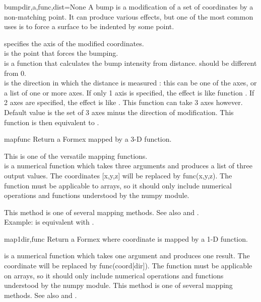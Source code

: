 {{\begin{methoddesc}{bump}{dir,a,func,dist=None}
A bump is a modification of a set of coordinates by a non-matching point. It can produce various effects, but one of the most common uses is to force a surface to be indented by some point.
        
 specifies the axis of the modified coordinates.\\
 is the point that forces the bumping.\\
 is a function that calculates the bump intensity from distance.  should be different from 0.\\
 is the direction in which the distance is measured : this can be one of the axes, or a list of one or more axes. If only 1 axis is specified, the effect is like function . If 2 axes are specified, the effect is like . This function can take 3 axes however. Default value is the set of 3 axes minus the direction of modification. This function is then equivalent to .
\end{methoddesc}

\begin{methoddesc}{map}{func}
Return a Formex mapped by a 3-D function.

This is one of the versatile mapping functions.\\
 is a numerical function which takes three arguments and produces a list of three output values. The coordinates [x,y,z] will be replaced by func(x,y,z). The function must be applicable to arrays, so it should only include numerical operations and functions understood by the numpy module.

This method is one of several mapping methods. See also  and .\\
Example:  is equivalent with .
\end{methoddesc}

\begin{methoddesc}{map1}{dir,func}
Return a Formex where coordinate  is mapped by a 1-D function.

 is a numerical function which takes one argument and produces one result. The coordinate  will be replaced by func(coord[dir]). The function must be applicable on arrays, so it should only include numerical operations and functions understood by the numpy module. This method is one of several mapping methods. See also  and .
\end{methoddesc}

}}
